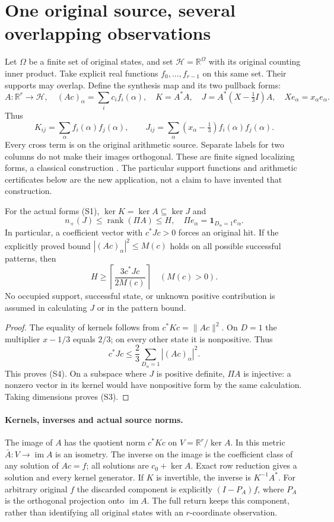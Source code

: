 \section{One original source, several overlapping observations}
Let $\Omega$ be a finite set of original states, and set
$\mathcal H=\mathbb R^\Omega$ with its original counting inner product.
Take explicit real functions $f_0,\ldots,f_{r-1}$ on this same set. Their
supports may overlap. Define the synthesis map and its two pullback forms:
\[
 A:\mathbb R^r\to\mathcal H,\quad (Ac)_\alpha=\sum_i c_if_i(\alpha),
 \quad K=A^*A,\quad
 J=A^*(X-\tfrac13I)A,\quad Xe_\alpha=x_\alpha e_\alpha.
 \tag{S1}
\]
Thus
\[
 K_{ij}=\sum_\alpha f_i(\alpha)f_j(\alpha),\qquad
 J_{ij}=\sum_\alpha(x_\alpha-\tfrac13)f_i(\alpha)f_j(\alpha).
 \tag{S2}
\]
Every cross term is on the original arithmetic source. Separate labels for two
columns do not make their images orthogonal.
These are finite signed localizing forms, a classical construction
\cite[\S2, equations (2.3)--(2.4); Theorem 3.2]{Lasserre}.
The particular support functions and arithmetic certificates below are the
new application, not a claim to have invented that construction.

\begin{theorem}
For the actual forms (S1), $\ker K=\ker A\subseteq\ker J$ and
\[
 n_+(J)\le\operatorname{rank}(\Pi A)\le H,
 \quad \Pi e_\alpha=\mathbf1_{D_\alpha=1}e_\alpha.
 \tag{S3}
\]
In particular, a coefficient vector with $c^*Jc>0$ forces an original hit.
If the explicitly proved bound $|(Ac)_\alpha|^2\le M(c)$ holds on all possible
successful patterns, then
\[
 \boxed{H\ge\left\lceil\frac{3c^*Jc}{2M(c)}\right\rceil}
 \quad(M(c)>0).
 \tag{S4}
\]
No occupied support, successful state, or unknown positive contribution is
assumed in calculating $J$ or in the pattern bound.
\end{theorem}
\begin{proof}
The equality of kernels follows from $c^*Kc=\|Ac\|^2$.
On $D=1$ the multiplier $x-1/3$ equals $2/3$; on every other state it is
nonpositive. Thus
\[
 c^*Jc\le\frac23\sum_{D_\alpha=1}|(Ac)_\alpha|^2.
\]
This proves (S4). On a subspace where $J$ is positive definite, $\Pi A$ is
injective: a nonzero vector in its kernel would have nonpositive form by the
same calculation. Taking dimensions proves (S3).
\end{proof}

\paragraph{Kernels, inverses and actual source norms.}
The image of $A$ has the quotient norm $c^*Kc$ on
$V=\mathbb R^r/\ker A$. In this metric $\bar A:V\to\operatorname{im}A$ is
an isometry. The inverse on the image is the coefficient class of any solution
of $Ac=f$; all solutions are $c_0+\ker A$. Exact row reduction gives a solution
and every kernel generator. If $K$ is invertible, the inverse is $K^{-1}A^*$.
For arbitrary original $f$ the discarded component is explicitly
$(I-P_A)f$, where $P_A$ is the orthogonal projection onto $\operatorname{im}A$.
The full return keeps this component, rather than identifying all original
states with an $r$-coordinate observation.

